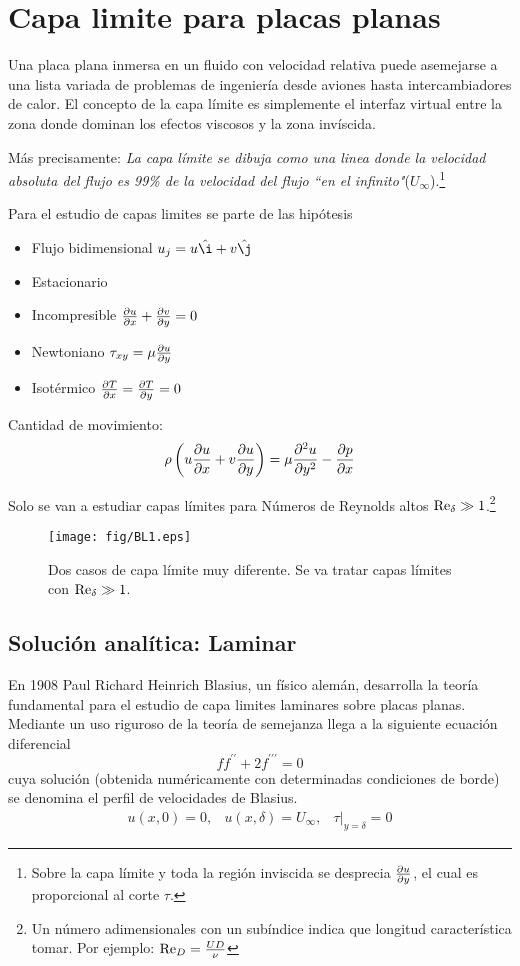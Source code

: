 \newcommand{\dstar}{\delta^{*}}
\section{Capa limite para placas planas}
Una placa plana inmersa en un fluido con velocidad relativa puede asemejarse a una lista variada de problemas de ingeniería desde aviones hasta intercambiadores de calor. El concepto de la capa límite es simplemente el interfaz virtual entre la zona donde dominan los efectos viscosos y la zona invíscida. 

Más precisamente:\textit{ La capa límite se dibuja como una linea donde la velocidad absoluta del flujo es 99\% de la velocidad del flujo ``en el infinito"{}}($U_\infty$).\footnote{Sobre la capa límite y toda la región inviscida se desprecia $\frac{\partial u}{\partial y}$, el cual es proporcional al corte $\tau$.}

 Para el estudio de capas limites se parte de las hipótesis 
 
 \begin{itemize}
 	\item Flujo bidimensional $u_j = u \hat{\i} + v \hat{\j}$
 	\item Estacionario
 	\item Incompresible $ \frac{\partial u}{\partial x}+\frac{\partial v}{\partial y}=0$
 	\item Newtoniano  $\tau_{xy}=\mu \frac{\partial u}{\partial y}$
 	\item Isotérmico $\frac{\partial T}{\partial x}=\frac{\partial T}{\partial y}=0$
 \end{itemize}

 Cantidad de movimiento:
\[
\rho\left(u\frac{\partial u}{\partial x}+v\frac{\partial u}{\partial y}\right)=\mu \frac{\partial^2 u}{\partial y ^2}-\frac{\partial p}{\partial x}
\]

Solo se van a estudiar capas límites para Números de Reynolds altos $\textrm{Re}_\delta\gg 1$.\footnote{Un número adimensionales con un subíndice indica que longitud característica tomar. Por ejemplo: $\textrm{Re}_D= \frac{UD}{\nu}$}

\begin{figure}%
    \centering
    \texttt{[image: fig/BL1.eps]}
    \caption{Dos casos de capa límite muy diferente. Se va tratar capas límites con $\textrm{Re}_\delta \gg1$.}
    \label{fig:BLintro}
\end{figure}
\subsection{Solución analítica: Laminar}\label{ssec:capalimLaminar}
En 1908 Paul Richard Heinrich Blasius, un físico alemán, desarrolla la teoría fundamental para el estudio de capa limites laminares sobre placas planas. Mediante un uso riguroso de la teoría de semejanza llega a la siguiente ecuación diferencial
\[
ff^{\prime\prime}+2f^{\prime\prime\prime}=0
\]
cuya solución (obtenida numéricamente con determinadas condiciones de borde) se denomina el perfil de velocidades de Blasius.
\[
\begin{array}{lll}
u(x,0)=0, & u(x,\delta)=U_\infty, & \tau|_{y=\delta} =0
\end{array}
\]

